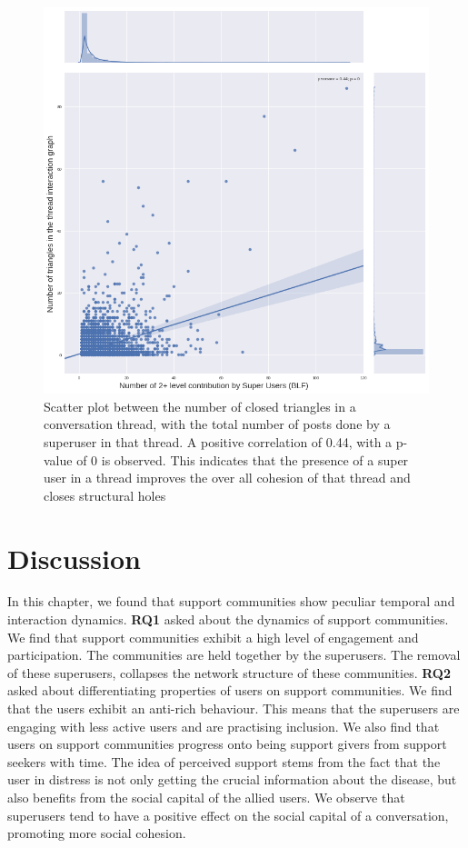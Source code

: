 \begin{figure}[!ht]
\centering
\includegraphics[width=0.7\linewidth ]{SUParticipationTriangles.png}

\caption{Scatter plot between the number of closed triangles in a conversation thread, with the total number of posts done by a superuser in that thread. A positive correlation of 0.44, with a p-value of 0 is observed. This indicates that the presence of a super user in a thread improves the over all cohesion of that thread and closes structural holes}
\label{fig:TriCorr}
\end{figure}

\section{Discussion}
In this chapter, we found that support communities show peculiar temporal and interaction dynamics. \textbf{RQ1} asked about the dynamics of support communities. We find that support communities exhibit a high level of engagement and participation. The communities are held together by the superusers. The removal of these superusers, collapses the network structure of these communities. \textbf{RQ2} asked about differentiating properties of users on support communities. We find that the users exhibit an anti-rich behaviour. This means that the superusers are engaging with less active users and are practising inclusion. We also find that users on support communities progress onto being support givers from support seekers with time. 
The idea of perceived support stems from the fact that the user in distress is not only getting the crucial information about the disease, but also benefits from the social capital of the allied users. We observe that  superusers tend to have a positive effect on the social capital of a conversation, promoting more social cohesion.

